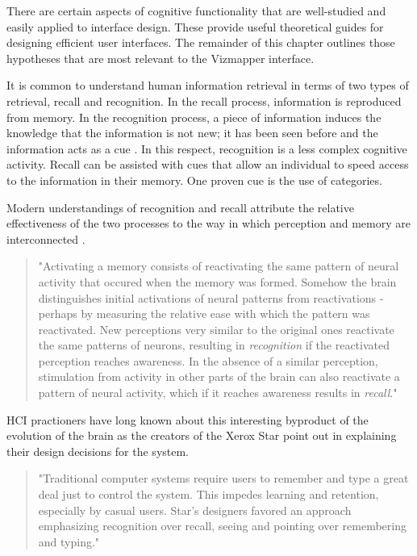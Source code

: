 There are certain aspects of cognitive functionality that are well-studied and easily applied to interface design. These provide useful theoretical guides for designing efficient user interfaces. The remainder of this chapter outlines those hypotheses that are most relevant to the Vizmapper interface.

It is common to understand human information retrieval in terms of two types of retrieval, recall and recognition. In the recall process, information is reproduced from memory. In the recognition process, a piece of information induces the knowledge that the information is not new; it has been seen before and the information acts as a cue \cite{hci1998}. In this respect, recognition is a less complex cognitive activity. Recall can be assisted with cues that allow an individual to speed access to the information in their memory. One proven cue is the use of categories.

Modern understandings of recognition and recall attribute the relative effectiveness of the two processes to the way in which perception and memory are interconnected \cite{mindinmind2010}.

\begin{quote}
"Activating a memory consists of reactivating the same pattern of neural activity that occured when the memory was formed. Somehow the brain distinguishes initial activations of neural patterns from reactivations - perhaps by measuring the relative ease with which the pattern was reactivated. New perceptions very similar to the original ones reactivate the same patterns of neurons, resulting in \emph{recognition} if the reactivated perception reaches awareness. In the absence of a similar perception, stimulation from activity in other parts of the brain can also reactivate a pattern of neural activity, which if it reaches awareness results in \emph{recall}." \cite{mindinmind2010}
\end{quote}

HCI practioners have long known about this interesting byproduct of the evolution of the brain as the creators of the Xerox Star point out in explaining their design decisions for the system.

\begin{quote}
"Traditional computer systems require users to remember and type a great deal just to control the system. This impedes learning and retention, especially by casual users. Star's designers favored an approach emphasizing recognition over recall, seeing and pointing over remembering and typing." \cite{xeroxstar1989}
\end{quote}

